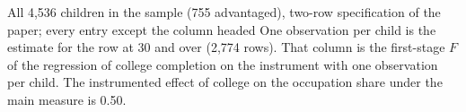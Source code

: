 All 4,536 children in the sample (755 advantaged), two-row specification of the paper; every entry except the column headed One observation per child is the estimate for the row at 30 and over (2,774 rows). That column is the first-stage $F$ of the regression of college completion on the instrument with one observation per child. The instrumented effect of college on the occupation share under the main measure is 0.50.%
